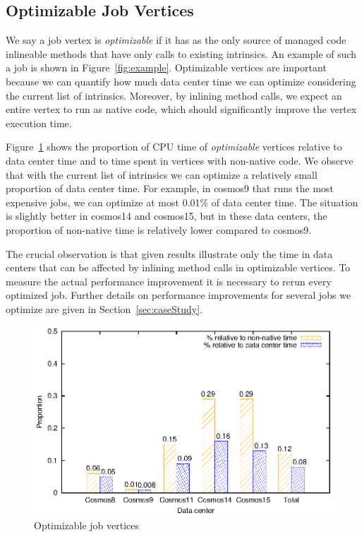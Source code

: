 
\subsection{Optimizable Job Vertices}
We say a job vertex is \emph{optimizable} if it has as the only source of managed code inlineable methods that have only calls to existing intrinsics. 
An example of such a job is shown in Figure~\ref{fig:example}. Optimizable vertices are important because we can quantify how much data center time we can optimize considering the current list of intrinsics. 
Moreover, by inlining method calls, we expect an entire vertex to run as native code, which should significantly improve the vertex execution time.

Figure~\ref{fig:optimizable} shows the proportion of CPU time of \emph{optimizable} vertices relative to data center time and to time spent in vertices with non-native code. 
We observe that with the current list of intrinsics we can optimize a relatively small proportion of data center time. 
For example, in cosmos9 that runs the most expensive jobs, we can optimize at most 0.01\% of data center time. 
The situation is slightly better in cosmos14 and cosmos15, but in these data centers, the proportion of non-native time is relatively lower compared to cosmos9.

The crucial observation is that given results illustrate only the time in data centers that can be affected by inlining method calls in optimizable vertices. 
To measure the actual performance improvement it is necessary to rerun every optimized job. 
Further details on performance improvements for several jobs we optimize are given in Section~\ref{sec:caseStudy}.

\begin{figure}[ht]
\includegraphics[width=\columnwidth]{graphs/optimizable2}
\caption{Optimizable job vertices}
\label{fig:optimizable}
\end{figure}

